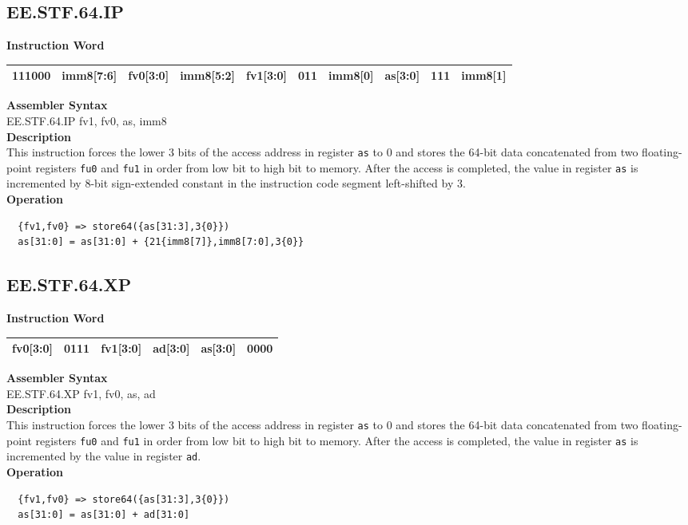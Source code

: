 \clearpage
\subsection{EE.STF.64.IP}\label{instruction:EESTF64IP}
\setlength\tabcolsep{6pt}
\textbf{Instruction Word} \\
\begin{tabular}{|c|c|c|c|c|c|c|c|c|c|}
	\hline
	111000 & imm8[7:6] & fv0[3:0] & imm8[5:2] & fv1[3:0] & 011 & imm8[0] & as[3:0] & 111 & imm8[1] \\
	\hline
\end{tabular}

\textbf{Assembler Syntax} \\
EE.STF.64.IP fv1, fv0, as, imm8 \\
\textbf{Description} \\
This instruction forces the lower 3 bits of the access address in register \lstinline{as} to 0 and stores the 64-bit data concatenated from two floating-point registers \lstinline{fu0} and \lstinline{fu1} in order from low bit to high bit to memory. After the access is completed, the value in register \lstinline{as} is incremented by 8-bit sign-extended constant in the instruction code segment left-shifted by 3.\\
\textbf{Operation}
\begin{lstlisting}
  {fv1,fv0} => store64({as[31:3],3{0}})
  as[31:0] = as[31:0] + {21{imm8[7]},imm8[7:0],3{0}}
\end{lstlisting}

\clearpage
\subsection{EE.STF.64.XP}\label{instruction:EESTF64XP}
\setlength\tabcolsep{6pt}
\textbf{Instruction Word} \\
\begin{tabular}{|c|c|c|c|c|c|}
	\hline
	fv0[3:0] & 0111 & fv1[3:0] & ad[3:0] & as[3:0] & 0000 \\
	\hline
\end{tabular}

\textbf{Assembler Syntax} \\
EE.STF.64.XP fv1, fv0, as, ad \\
\textbf{Description} \\
This instruction forces the lower 3 bits of the access address in register \lstinline{as} to 0 and stores the 64-bit data concatenated from two floating-point registers \lstinline{fu0} and \lstinline{fu1} in order from low bit to high bit to memory. After the access is completed, the value in register \lstinline{as} is incremented by the value in register \lstinline{ad}.\\
\textbf{Operation}
\begin{lstlisting}
  {fv1,fv0} => store64({as[31:3],3{0}})
  as[31:0] = as[31:0] + ad[31:0]
\end{lstlisting}

